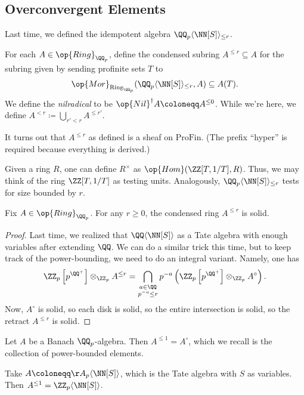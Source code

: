 \documentclass{article}
\begin{document}
\subsection{Overconvergent Elements}
Last time, we defined the idempotent algebra $\QQ_p\langle\NN[S]\rangle_{\le r}$.
\begin{definition}
	For each $A\in\op{Ring}_{\QQ_p}$, define the condensed subring $A^{\le r}\subseteq A$ for the subring given by sending profinite sets $T$ to
	\[\op{Mor}_{\mathrm{Ring}_{\QQ_p}}(\QQ_p\langle\NN[S]\rangle_{\le r},A)\subseteq A(T).\]
	We define the \textit{nilradical} to be $\op{Nil}^\dagger A\coloneqq A^{\le0}$. While we're here, we define $A^{<r}\coloneqq\bigcup_{r'<r}A^{\le r'}$.
\end{definition}
\begin{remark}
	It turns out that $A^{\le r}$ as defined is a sheaf on $\mathrm{ProFin}$. (The prefix ``hyper'' is required because everything is derived.)
\end{remark}
\begin{remark}
	Given a ring $R$, one can define $R^\times$ as $\op{Hom}(\ZZ[T,1/T],R)$. Thus, we may think of the ring $\ZZ[T,1/T]$ as testing units. Analogously, $\QQ_p\langle\NN[S]\rangle_{\le r}$ tests for size bounded by $r$.
\end{remark}
\begin{lemma}
	Fix $A\in\op{Ring}_{\QQ_p}$. For any $r\ge0$, the condensed ring $A^{\le r}$ is solid.
\end{lemma}
\begin{proof}
	Last time, we realized that $\QQ\langle\NN[S]\rangle$ as a Tate algebra with enough variables after extending $\QQ$. We can do a similar trick this time, but to keep track of the power-bounding, we need to do an integral variant. Namely, one has
	\[\ZZ_p\left[p^{\QQ^+}\right]\otimes_{\ZZ_p}A^{\le r}=\bigcap_{\substack{a\in\QQ\\p^{-a}\le r}}p^{-a}\left(\ZZ_p\left[p^{\QQ^+}\right]\otimes_{\ZZ_p}A^\circ\right).\]
	Now, $A^\circ$ is solid, so each disk is solid, so the entire intersection is solid, so the retract $A^{\le r}$ is solid.
\end{proof}
\begin{example}
	Let $A$ be a Banach $\QQ_p$-algebra. Then $A^{\le1}=A^\circ$, which we recall is the collection of power-bounded elements.
\end{example}
\begin{example}
	Take $A\coloneqq\AA_p\langle\NN[S]\rangle$, which is the Tate algebra with $S$ as variables. Then $A^{\le1}=\ZZ_p\langle\NN[S]\rangle$.
\end{example}
\end{document}
